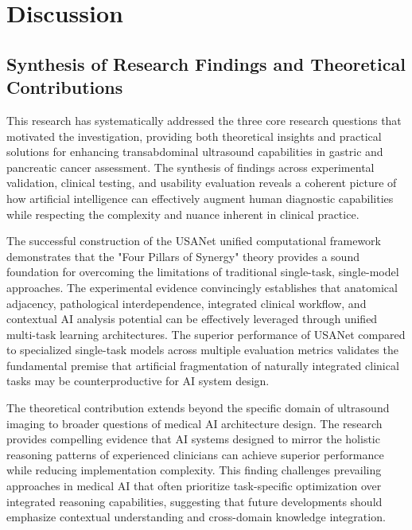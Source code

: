 
\chapter{Discussion} \label{chp:discussion}

\section{Synthesis of Research Findings and Theoretical Contributions}

This research has systematically addressed the three core research questions that motivated the investigation, providing both theoretical insights and practical solutions for enhancing transabdominal ultrasound capabilities in gastric and pancreatic cancer assessment. The synthesis of findings across experimental validation, clinical testing, and usability evaluation reveals a coherent picture of how artificial intelligence can effectively augment human diagnostic capabilities while respecting the complexity and nuance inherent in clinical practice.

The successful construction of the USANet unified computational framework demonstrates that the "Four Pillars of Synergy" theory provides a sound foundation for overcoming the limitations of traditional single-task, single-model approaches. The experimental evidence convincingly establishes that anatomical adjacency, pathological interdependence, integrated clinical workflow, and contextual AI analysis potential can be effectively leveraged through unified multi-task learning architectures. The superior performance of USANet compared to specialized single-task models across multiple evaluation metrics validates the fundamental premise that artificial fragmentation of naturally integrated clinical tasks may be counterproductive for AI system design.

The theoretical contribution extends beyond the specific domain of ultrasound imaging to broader questions of medical AI architecture design. The research provides compelling evidence that AI systems designed to mirror the holistic reasoning patterns of experienced clinicians can achieve superior performance while reducing implementation complexity. This finding challenges prevailing approaches in medical AI that often prioritize task-specific optimization over integrated reasoning capabilities, suggesting that future developments should emphasize contextual understanding and cross-domain knowledge integration.

